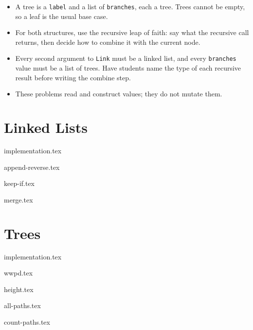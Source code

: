 \documentclass{exam}
\begin{document}
\begin{meta}
\begin{itemize}
    \item A tree is a \lstinline{label} and a list of \lstinline{branches}, each a tree. Trees cannot be empty, so a leaf is the usual base case.
    \item For both structures, use the recursive leap of faith: say what the recursive call returns, then decide how to combine it with the current node.
    \item Every second argument to \lstinline{Link} must be a linked list, and every \lstinline{branches} value must be a list of trees. Have students name the type of each recursive result before writing the combine step.
    \item These problems read and construct values; they do not mutate them.
\end{itemize}
\end{meta}

\section{Linked Lists}
\begin{blocksection}
{implementation.tex}
\end{blocksection}
\begin{questions}

    {append-reverse.tex}

    {keep-if.tex}

    {merge.tex}
\end{questions}

\newpage
\section{Trees}
\begin{blocksection}
\def\treemultiplequestions{}
{implementation.tex}
\end{blocksection}
\begin{questions}
    \setcounter{question}{3}
    {wwpd.tex}

    {height.tex}


    {all-paths.tex}

    {count-paths.tex}
\end{questions}
\end{document}

